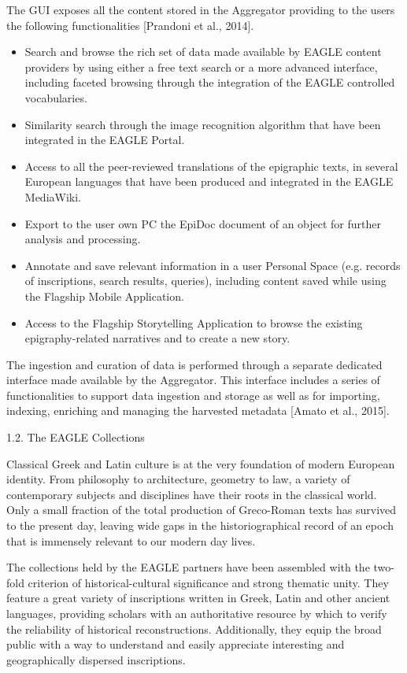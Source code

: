 \documentclass[amsthm,ebook]{saparticle}
\begin{document}
The GUI exposes all the content stored in the Aggregator providing to the users the following functionalities [Prandoni
et al., 2014].

\begin{itemize}
\item Search and browse the rich set of data made available by EAGLE content providers by using either a free text
search or a more advanced interface, including faceted browsing through the integration of the EAGLE controlled
vocabularies.
\item Similarity search through the image recognition algorithm that have been integrated in the EAGLE Portal.
\item Access to all the peer-reviewed translations of the epigraphic texts, in several European languages that have been
produced and integrated in the EAGLE MediaWiki.
\item Export to the user own PC the EpiDoc document of an object for further analysis and processing.
\item Annotate and save relevant information in a user Personal Space (e.g. records of inscriptions, search results,
queries), including content saved while using the Flagship Mobile Application.
\item Access to the Flagship Storytelling Application to browse the existing epigraphy-related narratives and to create
a new story.
\end{itemize}
The ingestion and curation of data is performed through a separate dedicated interface made available by the Aggregator.
This interface includes a series of functionalities to support data ingestion and storage as well as for importing,
indexing, enriching and managing the harvested metadata [Amato et al., 2015].

1.2. The EAGLE Collections

Classical Greek and Latin culture is at the very foundation of modern European identity. From philosophy to
architecture, geometry to law, a variety of contemporary subjects and disciplines have their roots in the classical
world. Only a small fraction of the total production of Greco-Roman texts has survived to the present day, leaving wide
gaps in the historiographical record of an epoch that is immensely relevant to our modern day lives. 

The collections held by the EAGLE partners have been assembled with the two-fold criterion of historical-cultural
significance and strong thematic unity. They feature a great variety of inscriptions written in Greek, Latin and other
ancient languages, providing scholars with an authoritative resource by which to verify the reliability of historical
reconstructions. Additionally, they equip the broad public with a way to understand and easily appreciate interesting
and geographically dispersed inscriptions.
\end{document}
